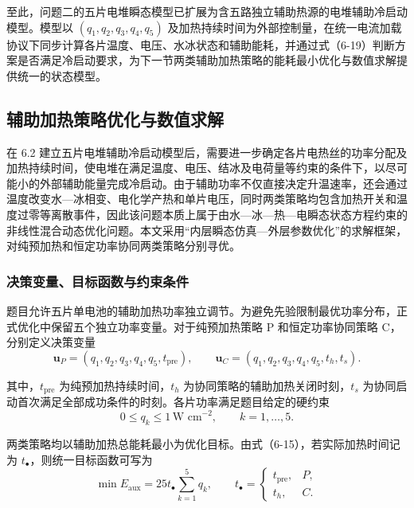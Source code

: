\documentclass[bwprint]{gmcmthesis}
\numberwithin{figure}{section}
\begin{document}
\noindent 至此，问题二的五片电堆瞬态模型已扩展为含五路独立辅助热源的电堆辅助冷启动模型。模型以 \((q_1, q_2, q_3, q_4, q_5)\) 及加热持续时间为外部控制量，在统一电流加载协议下同步计算各片温度、电压、水冰状态和辅助能耗，并通过式（6-19）判断方案是否满足冷启动要求，为下一节两类辅助加热策略的能耗最小优化与数值求解提供统一的状态模型。

\subsection{辅助加热策略优化与数值求解}
在 6.2 建立五片电堆辅助冷启动模型后，需要进一步确定各片电热丝的功率分配及加热持续时间，使电堆在满足温度、电压、结冰及电荷量等约束的条件下，以尽可能小的外部辅助能量完成冷启动。由于辅助功率不仅直接决定升温速率，还会通过温度改变水—冰相变、电化学产热和单片电压，同时两类策略均包含加热开关和温度过零等离散事件，因此该问题本质上属于由水—冰—热—电瞬态状态方程约束的非线性混合动态优化问题。本文采用“内层瞬态仿真—外层参数优化”的求解框架，对纯预加热和恒定功率协同两类策略分别寻优。

\subsubsection{决策变量、目标函数与约束条件}

\noindent 题目允许五片单电池的辅助加热功率独立调节。为避免先验限制最优功率分布，正式优化中保留五个独立功率变量。对于纯预加热策略 P 和恒定功率协同策略 C，分别定义决策变量
\begin{equation}
\boldsymbol{u}_P = (q_1, q_2, q_3, q_4, q_5, t_{\text{pre}}), \qquad \boldsymbol{u}_C = (q_1, q_2, q_3, q_4, q_5, t_h, t_s). \tag{6-25}
\end{equation}

\noindent 其中，\(t_{\text{pre}}\) 为纯预加热持续时间，\(t_h\) 为协同策略的辅助加热关闭时刻，\(t_s\) 为协同启动首次满足全部成功条件的时刻。各片功率满足题目给定的硬约束
\begin{equation}
0 \leq q_k \leq 1 \, \text{W cm}^{-2}, \qquad k = 1, \dots, 5. \tag{6-26}
\end{equation}

\noindent 两类策略均以辅助加热总能耗最小为优化目标。由式（6-15），若实际加热时间记为 \(t_\bullet\)，则统一目标函数可写为
\begin{equation}
\min E_{\text{aux}} = 25 t_\bullet \sum_{k=1}^5 q_k, \qquad t_\bullet = \begin{cases} t_{\text{pre}}, & P, \\ t_h, & C. \end{cases} \tag{6-27}
\end{equation}
\end{document}

